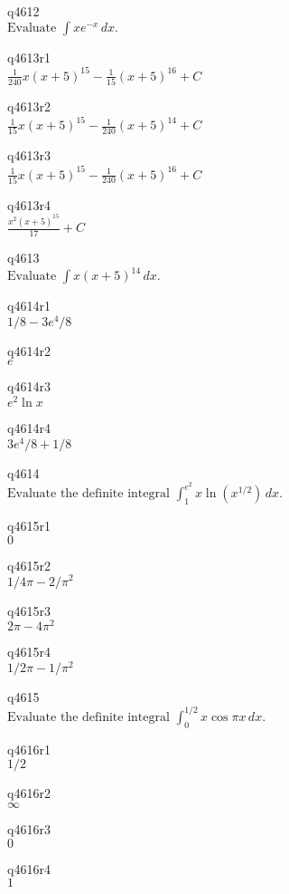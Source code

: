 q4612\\
\(\displaystyle \text{Evaluate } \int x e^{-x}\,dx. \)

q4613r1\\
\(\displaystyle \frac{1}{240} x(x+5)^{15} - \frac{1}{15}(x+5)^{16} + C \)

q4613r2\\
\(\displaystyle \frac{1}{15} x(x+5)^{15} - \frac{1}{240}(x+5)^{14} + C \)

q4613r3\\
\(\displaystyle \frac{1}{15}x(x+5)^{15} - \frac{1}{240}(x+5)^{16} + C \)

q4613r4\\
\(\displaystyle \frac{x^2(x+5)^{15}}{17} + C \)

q4613\\
\(\displaystyle \text{Evaluate } \int x(x+5)^{14} \,dx. \)

q4614r1\\
\(\displaystyle 1/8 - 3e^4 / 8 \)

q4614r2\\
\(\displaystyle e \)

q4614r3\\
\(\displaystyle e^2 \ln x \)

q4614r4\\
\(\displaystyle 3e^4/8 + 1/8 \)

q4614\\
\(\displaystyle \text{Evaluate the definite integral } \int_1^{e^2} x\ln (x^{1/2}) \, dx. \)

q4615r1\\
\(\displaystyle 0 \)

q4615r2\\
\(\displaystyle 1/4\pi - 2/\pi^2 \)

q4615r3\\
\(\displaystyle 2\pi - 4\pi^2 \)

q4615r4\\
\(\displaystyle 1/2\pi - 1/\pi^2 \)

q4615\\
\(\displaystyle \text{Evaluate the definite integral } \int_0^{1/2} x \cos \pi x\, dx.\)

q4616r1\\
\(\displaystyle 1/2 \)

q4616r2\\
\(\displaystyle \infty \)

q4616r3\\
\(\displaystyle 0 \)

q4616r4\\
\(\displaystyle 1 \)

